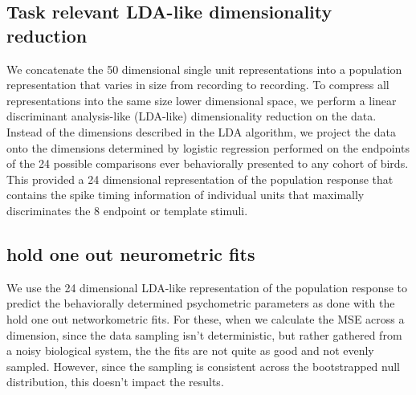 \subsection{Task relevant LDA-like dimensionality reduction}

We concatenate the 50 dimensional single unit representations into a population representation that varies in size from recording to recording. To compress all representations into the same size lower dimensional space, we perform a linear discriminant analysis-like (LDA-like) dimensionality reduction on the data. Instead of the dimensions described in the LDA algorithm, we project the data onto the dimensions determined by logistic regression performed on the endpoints of the 24 possible comparisons ever behaviorally presented to any cohort of birds. This provided a 24 dimensional representation of the population response that contains the spike timing information of individual units that maximally discriminates the 8 endpoint or template stimuli.

\subsection{hold one out neurometric fits}

We use the 24 dimensional LDA-like representation of the population response to predict the behaviorally determined psychometric parameters as done with the hold one out networkometric fits. For these, when we calculate the MSE across a dimension, since the data sampling isn't deterministic, but rather gathered from a noisy biological system, the the fits are not quite as good and not evenly sampled. However, since the sampling is consistent across the bootstrapped null distribution, this doesn't impact the results.
